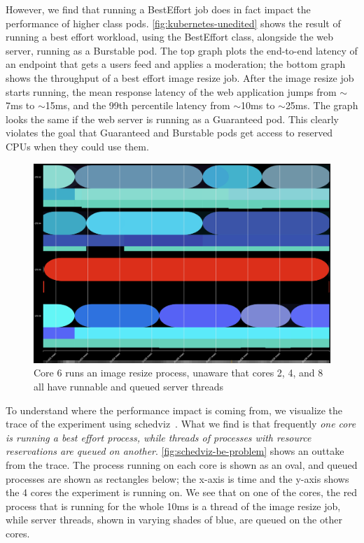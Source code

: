 However, we find that running a BestEffort job does in fact impact the
performance of higher class pods. \autoref{fig:kubernetes-unedited} shows the
result of running a best effort workload, using the BestEffort class, alongside
the web server, running as a Burstable pod. The top graph plots the end-to-end
latency of an endpoint that gets a users feed and applies a moderation; the
bottom graph shows the throughput of a best effort image resize job. After the
image resize job starts running, the mean response latency of the web
application jumps from $\sim$7ms to $\sim$15ms, and the 99th percentile latency
from $\sim$10ms to $\sim$25ms. The graph looks the same if the web server is
running as a Guaranteed pod. This clearly violates the goal that Guaranteed and
Burstable pods get access to reserved CPUs when they could use them.


\begin{figure}[t]
    \centering
    \includegraphics[width=\columnwidth]{graphs/schedviz-be-problem.png}
    \caption{Core 6 runs an image resize process, unaware that cores 2, 4, and 8
    all have runnable and queued server threads}\label{fig:schedviz-be-problem}
\end{figure}

To understand where the performance impact is coming from, we visualize the
trace of the experiment using schedviz~\cite{schedviz-tool}. What we find is
that frequently \textit{one core is running a best effort process, while threads
of processes with resource reservations are queued on another}.
\autoref{fig:schedviz-be-problem} shows an outtake from the trace. The process
running on each core is shown as an oval, and queued processes are shown as
rectangles below; the x-axis is time and the y-axis shows the 4 cores the
experiment is running on. We see that on one of the cores, the red process that
is running for the whole 10ms is a thread of the image resize job, while server
threads, shown in varying shades of blue, are queued on the other cores.

